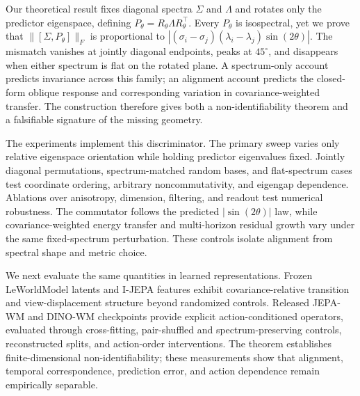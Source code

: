 \documentclass{article}
\begin{document}
Our theoretical result fixes diagonal spectra $\Sigma$ and $\Lambda$ and rotates only the predictor eigenspace, defining $P_\theta=R_\theta\Lambda R_\theta^\top$. Every $P_\theta$ is isospectral, yet we prove that $\|[\Sigma,P_\theta]\|_F$ is proportional to $|(\sigma_i-\sigma_j)(\lambda_i-\lambda_j)\sin(2\theta)|$. The mismatch vanishes at jointly diagonal endpoints, peaks at $45^\circ$, and disappears when either spectrum is flat on the rotated plane. A spectrum-only account predicts invariance across this family; an alignment account predicts the closed-form oblique response and corresponding variation in covariance-weighted transfer. The construction therefore gives both a non-identifiability theorem and a falsifiable signature of the missing geometry.

The experiments implement this discriminator. The primary sweep varies only relative eigenspace orientation while holding predictor eigenvalues fixed. Jointly diagonal permutations, spectrum-matched random bases, and flat-spectrum cases test coordinate ordering, arbitrary noncommutativity, and eigengap dependence. Ablations over anisotropy, dimension, filtering, and readout test numerical robustness. The commutator follows the predicted $|\sin(2\theta)|$ law, while covariance-weighted energy transfer and multi-horizon residual growth vary under the same fixed-spectrum perturbation. These controls isolate alignment from spectral shape and metric choice.

We next evaluate the same quantities in learned representations. Frozen LeWorldModel latents and I-JEPA features exhibit covariance-relative transition and view-displacement structure beyond randomized controls. Released JEPA-WM and DINO-WM checkpoints provide explicit action-conditioned operators, evaluated through cross-fitting, pair-shuffled and spectrum-preserving controls, reconstructed splits, and action-order interventions. The theorem establishes finite-dimensional non-identifiability; these measurements show that alignment, temporal correspondence, prediction error, and action dependence remain empirically separable.
\end{document}
